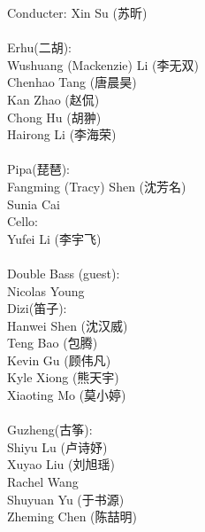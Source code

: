\documentclass[letter,6pt,poets]{ConcProg}
\begin{document}
\begin{multicols}{2}%


Conducter: Xin Su (苏昕)
\\
\\
 Erhu(二胡):                 \\
Wushuang (Mackenzie) Li (李无双)   \\
Chenhao Tang  (唐晨昊) \\
Kan Zhao (赵侃)\\
Chong Hu (胡翀)\\
Hairong Li (李海荣)\\
\\
Pipa(琵琶):\\
Fangming (Tracy) Shen (沈芳名)\\
Sunia Cai\\

Cello:\\
Yufei Li (李宇飞)\\
\\
Double Bass (guest):\\
Nicolas Young\\

Dizi(笛子): 				 \\    
Hanwei Shen		(沈汉威)     \\
Teng Bao (包腾)\\
Kevin Gu   (顾伟凡)               \\
Kyle Xiong (熊天宇)\\
Xiaoting Mo (莫小婷)\\
\\
Guzheng(古筝):\\
Shiyu Lu (卢诗妤)\\
Xuyao Liu (刘旭瑶)\\               
Rachel Wang \\
Shuyuan Yu  (于书源)\\
Zheming Chen (陈喆明)\\
\\
\\
\\
\end{multicols}
\end{document}
